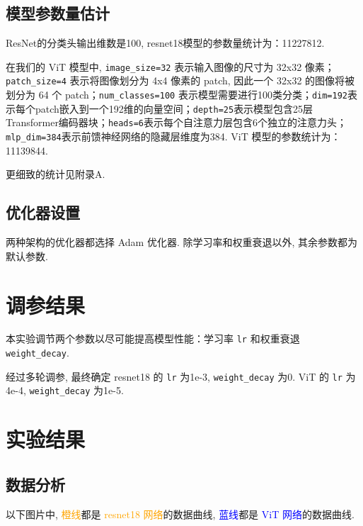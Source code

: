\documentclass[notitlepage,cs4size,punct,oneside]{ctexrep}
\numberwithin{equation}{chapter}
\theoremstyle{mystyle}
\begin{document}
\subsection{模型参数量估计}
ResNet的分类头输出维数是100, resnet18模型的参数量统计为：11227812.

在我们的 ViT 模型中, \texttt{image\_size=32} 表示输入图像的尺寸为 32x32 像素；\texttt{patch\_size=4} 表示将图像划分为 4x4 像素的 patch, 因此一个 32x32 的图像将被划分为 64 个 patch；\texttt{num\_classes=100} 表示模型需要进行100类分类；\texttt{dim=192}表示每个patch嵌入到一个192维的向量空间；\texttt{depth=25}表示模型包含25层Transformer编码器块；\texttt{heads=6}表示每个自注意力层包含6个独立的注意力头；\texttt{mlp\_dim=384}表示前馈神经网络的隐藏层维度为384. ViT 模型的参数统计为：11139844.

更细致的统计见附录A.

\subsection{优化器设置}
两种架构的优化器都选择 Adam 优化器. 除学习率和权重衰退以外, 其余参数都为默认参数.


\section{调参结果}
本实验调节两个参数以尽可能提高模型性能：学习率 \texttt{lr} 和权重衰退 \texttt{weight\_decay}.

经过多轮调参, 最终确定 resnet18 的 \texttt{lr} 为1e-3, \texttt{weight\_decay} 为0. ViT 的 \texttt{lr} 为4e-4, \texttt{weight\_decay} 为1e-5.


\section{实验结果}
\subsection{数据分析}
以下图片中, \textcolor{orange}{橙线}都是 \textcolor{orange}{resnet18 网络}的数据曲线, \textcolor{blue}{蓝线}都是 \textcolor{blue}{ViT 网络}的数据曲线.
\end{document}
